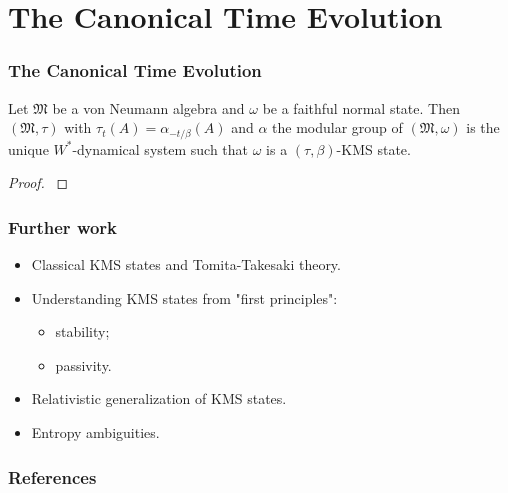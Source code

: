 \documentclass{beamer}
\begin{document}
\section{The Canonical Time Evolution}

\begin{frame}
	\frametitle{The Canonical Time Evolution}
	\begin{theorem}[$\bigstar\bigstar\bigstar$]
		Let $\mathfrak{M}$ be a von Neumann algebra and $\omega$ be a faithful normal state. Then $(\mathfrak{M},\tau)$ with $\tau_t(A) = \alpha_{-t/\beta}(A)$ and $\alpha$ the modular group of $(\mathfrak{M},\omega)$ is the unique $W^*$-dynamical system such that $\omega$ is a $(\tau,\beta)$-KMS state.
	\end{theorem}
	\begin{proof}
		\cite{Duvenhage1999}
	\end{proof}
\end{frame}

\begin{frame}
	\frametitle{Further work}
	\begin{itemize}
		\item Classical KMS states and Tomita-Takesaki theory.
		\item Understanding KMS states from "first principles":
		\begin{itemize}
			\item stability;
			\item passivity.
		\end{itemize}
		\item Relativistic generalization of KMS states.
		\item Entropy ambiguities. 
	\end{itemize}
\end{frame}

\begin{frame}[allowframebreaks]
	\frametitle{References}
	
	
\end{frame}
\end{document}
